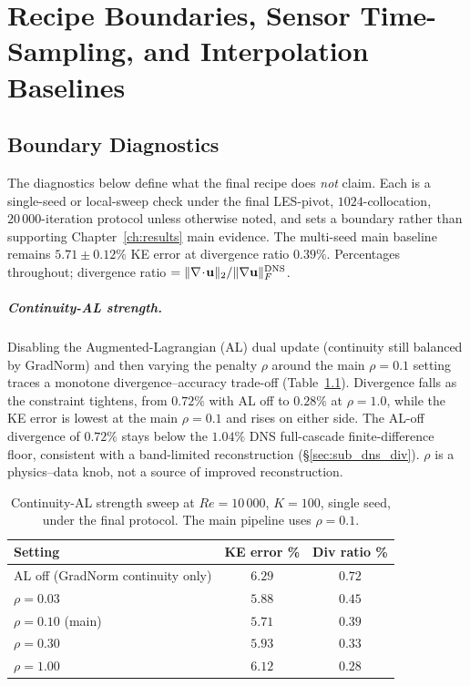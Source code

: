 \chapter{Recipe Boundaries, Sensor Time-Sampling, and Interpolation Baselines}
\label{app:diagnostic_ablation_forward_cfd}

\section{Boundary Diagnostics}
\label{sec:diagnostics}

The diagnostics below define what the final recipe does \emph{not} claim. Each is a single-seed or local-sweep check under the final LES-pivot, $1024$-collocation, $20\,000$-iteration protocol unless otherwise noted, and sets a boundary rather than supporting Chapter~\ref{ch:results} main evidence. The multi-seed main baseline remains $5.71 \pm 0.12\%$ KE error at divergence ratio $0.39\%$. Percentages throughout; divergence ratio $= \Vert\nabla\!\cdot\!\mathbf{u}\Vert_2 / \Vert\nabla\mathbf{u}\Vert_F^{\rm DNS}$.

\paragraph{Continuity-AL strength.}
\label{sec:al_strength_appendix}
Disabling the Augmented-Lagrangian (AL) dual update (continuity still balanced by GradNorm) and then varying the penalty $\rho$ around the main $\rho=0.1$ setting traces a monotone divergence--accuracy trade-off (Table~\ref{tab:al_strength}). Divergence falls as the constraint tightens, from $0.72\%$ with AL off to $0.28\%$ at $\rho=1.0$, while the KE error is lowest at the main $\rho=0.1$ and rises on either side. The AL-off divergence of $0.72\%$ stays below the $1.04\%$ DNS full-cascade finite-difference floor, consistent with a band-limited reconstruction (\S\ref{sec:sub_dns_div}). $\rho$ is a physics--data knob, not a source of improved reconstruction.

\begin{table}[!htbp]
    \centering
    \caption{Continuity-AL strength sweep at $Re=10\,000$, $K=100$, single seed, under the final protocol. The main pipeline uses $\rho=0.1$.}
    \label{tab:al_strength}
    \footnotesize
    \begin{tabular}{lcc}
    \toprule
    \textbf{Setting} & \textbf{KE error \%} & \textbf{Div ratio \%} \\
    \midrule
    AL off (GradNorm continuity only) & $6.29$ & $0.72$ \\
    $\rho = 0.03$                      & $5.88$ & $0.45$ \\
    $\rho = 0.10$ (main)              & $5.71$ & $0.39$ \\
    $\rho = 0.30$                      & $5.93$ & $0.33$ \\
    $\rho = 1.00$                      & $6.12$ & $0.28$ \\
    \bottomrule
    \end{tabular}
\end{table}

